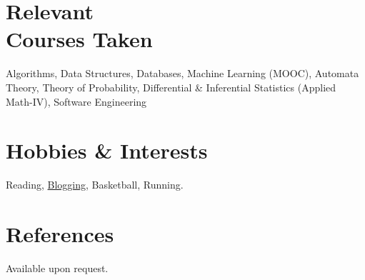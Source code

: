\documentclass[margin,line]{res}
\begin{document}
\begin{resume}
\section{\sc Relevant \\Courses Taken}
Algorithms, Data Structures, Databases, Machine Learning (MOOC), Automata Theory, Theory of Probability, Differential \& Inferential Statistics (Applied Math-IV), Software Engineering

\section{\sc Hobbies \& Interests}
Reading, {\href{http://www.swadhwa.me/blog/}{\color{blue} Blogging}}, Basketball, Running.
\section{\sc References }
Available upon request.
\end{resume}
\end{document}
